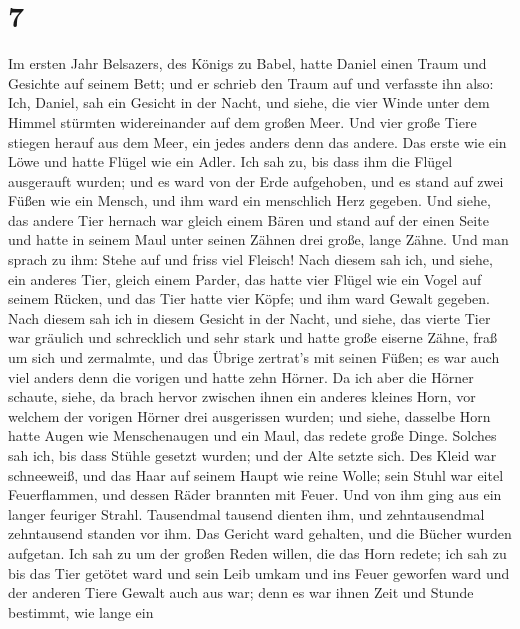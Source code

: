 \hypertarget{section-6}{%
\section{7}\label{section-6}}

 Im ersten Jahr Belsazers, des Königs zu Babel, hatte
Daniel einen Traum und Gesichte auf seinem Bett; und er schrieb den
Traum auf und verfasste ihn also:  Ich, Daniel, sah ein
Gesicht in der Nacht, und siehe, die vier Winde unter dem Himmel
stürmten widereinander auf dem großen Meer.  Und vier
große Tiere stiegen herauf aus dem Meer, ein jedes anders denn das
andere.  Das erste wie ein Löwe und hatte Flügel wie ein
Adler. Ich sah zu, bis dass ihm die Flügel ausgerauft wurden; und es
ward von der Erde aufgehoben, und es stand auf zwei Füßen wie ein
Mensch, und ihm ward ein menschlich Herz gegeben.  Und
siehe, das andere Tier hernach war gleich einem Bären und stand auf der
einen Seite und hatte in seinem Maul unter seinen Zähnen drei große,
lange Zähne. Und man sprach zu ihm: Stehe auf und friss viel Fleisch!
 Nach diesem sah ich, und siehe, ein anderes Tier, gleich
einem Parder, das hatte vier Flügel wie ein Vogel auf seinem Rücken, und
das Tier hatte vier Köpfe; und ihm ward Gewalt gegeben. 
Nach diesem sah ich in diesem Gesicht in der Nacht, und siehe, das
vierte Tier war gräulich und schrecklich und sehr stark und hatte große
eiserne Zähne, fraß um sich und zermalmte, und das Übrige zertrat's mit
seinen Füßen; es war auch viel anders denn die vorigen und hatte zehn
Hörner.  Da ich aber die Hörner schaute, siehe, da brach
hervor zwischen ihnen ein anderes kleines Horn, vor welchem der vorigen
Hörner drei ausgerissen wurden; und siehe, dasselbe Horn hatte Augen wie
Menschenaugen und ein Maul, das redete große Dinge. 
Solches sah ich, bis dass Stühle gesetzt wurden; und der Alte setzte
sich. Des Kleid war schneeweiß, und das Haar auf seinem Haupt wie reine
Wolle; sein Stuhl war eitel Feuerflammen, und dessen Räder brannten mit
Feuer.  Und von ihm ging aus ein langer feuriger Strahl.
Tausendmal tausend dienten ihm, und zehntausendmal zehntausend standen
vor ihm. Das Gericht ward gehalten, und die Bücher wurden aufgetan.
 Ich sah zu um der großen Reden willen, die das Horn
redete; ich sah zu bis das Tier getötet ward und sein Leib umkam und ins
Feuer geworfen ward  und der anderen Tiere Gewalt auch
aus war; denn es war ihnen Zeit und Stunde bestimmt, wie lange ein
